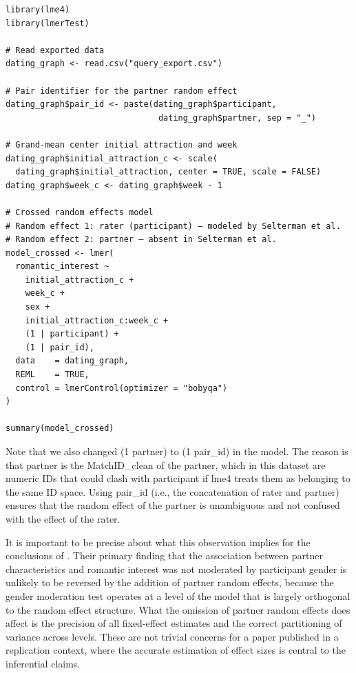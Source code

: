 \documentclass[sn-apa,pdflatex]{sn-jnl}
\theoremstyle{remark}
\theoremstyle{definition}
\begin{document}
\begin{verbatim}
library(lme4)
library(lmerTest)

# Read exported data
dating_graph <- read.csv("query_export.csv")

# Pair identifier for the partner random effect
dating_graph$pair_id <- paste(dating_graph$participant,
                               dating_graph$partner, sep = "_")

# Grand-mean center initial attraction and week
dating_graph$initial_attraction_c <- scale(
  dating_graph$initial_attraction, center = TRUE, scale = FALSE)
dating_graph$week_c <- dating_graph$week - 1

# Crossed random effects model
# Random effect 1: rater (participant) — modeled by Selterman et al.
# Random effect 2: partner — absent in Selterman et al.
model_crossed <- lmer(
  romantic_interest ~
    initial_attraction_c +
    week_c +
    sex +
    initial_attraction_c:week_c +
    (1 | participant) +
    (1 | pair_id),
  data    = dating_graph,
  REML    = TRUE,
  control = lmerControl(optimizer = "bobyqa")
)

summary(model_crossed)
\end{verbatim}

Note that we also changed (1 \textbar{} partner) to (1 \textbar{}
pair\_id) in the model. The reason is that partner is the MatchID\_clean
of the partner, which in this dataset are numeric IDs that could clash
with participant if lme4 treats them as belonging to the same ID space.
Using pair\_id (i.e., the concatenation of rater and partner) ensures
that the random effect of the partner is unambiguous and not confused
with the effect of the rater.

It is important to be precise about what this observation implies for
the conclusions of \citet{Selterman2015}. Their primary finding that the
association between partner characteristics and romantic interest was
not moderated by participant gender is unlikely to be reversed by the
addition of partner random effects, because the gender moderation test
operates at a level of the model that is largely orthogonal to the
random effect structure. What the omission of partner random effects
does affect is the precision of all fixed-effect estimates and the
correct partitioning of variance across levels. These are not trivial
concerns for a paper published in a replication context, where the
accurate estimation of effect sizes is central to the inferential
claims.
\end{document}
